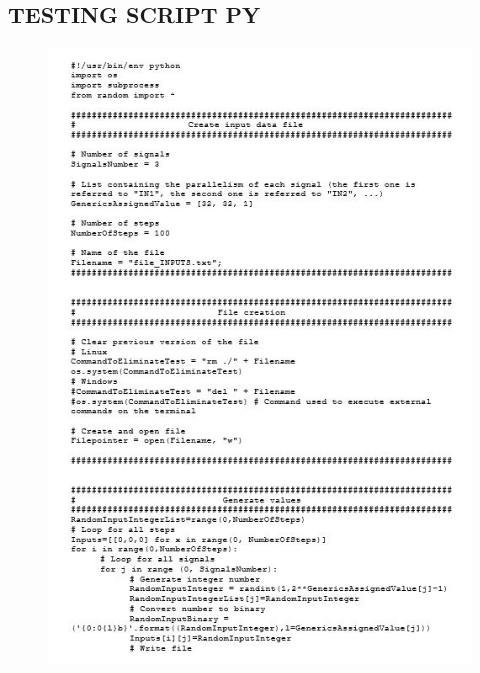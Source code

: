\subsection{TESTING SCRIPT PY}
\begin{figure}[!htb]
	\centering
	\includegraphics[scale=1.2]{immagini/testing1}
	\label{testing1}
\end{figure}
